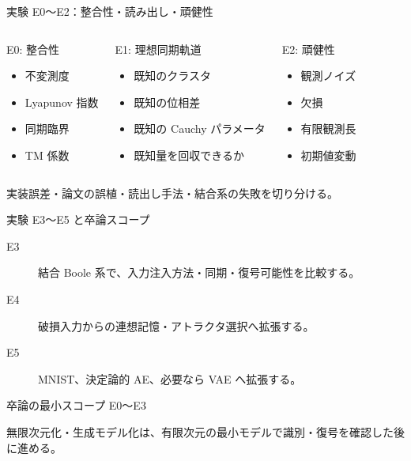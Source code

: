 \documentclass[aspectratio=169,11pt]{beamer}
\begin{document}
\begin{frame}{実験 E0〜E2：整合性・読み出し・頑健性}
  \small
  \begin{columns}[T]
    \begin{block}{E0: 整合性}
      \begin{itemize}
        \item 不変測度
        \item Lyapunov 指数
        \item 同期臨界
        \item TM 係数
      \end{itemize}
    \end{block}
    \begin{block}{E1: 理想同期軌道}
      \begin{itemize}
        \item 既知のクラスタ
        \item 既知の位相差
        \item 既知の Cauchy パラメータ
        \item 既知量を回収できるか
      \end{itemize}
    \end{block}
    \begin{block}{E2: 頑健性}
      \begin{itemize}
        \item 観測ノイズ
        \item 欠損
        \item 有限観測長
        \item 初期値変動
      \end{itemize}
    \end{block}
  \end{columns}
  \vfill
  実装誤差・論文の誤植・読出し手法・結合系の失敗を切り分ける。
\end{frame}

\begin{frame}{実験 E3〜E5 と卒論スコープ}
  \begin{description}
    \item[E3] 結合 Boole 系で、入力注入方法・同期・復号可能性を比較する。
    \item[E4] 破損入力からの連想記憶・アトラクタ選択へ拡張する。
    \item[E5] MNIST、決定論的 AE、必要なら VAE へ拡張する。
  \end{description}
  \vfill
  \begin{alertblock}{卒論の最小スコープ}
    \centering
    \Large E0〜E3
  \end{alertblock}
  無限次元化・生成モデル化は、有限次元の最小モデルで識別・復号を確認した後に進める。
\end{frame}
\end{document}
